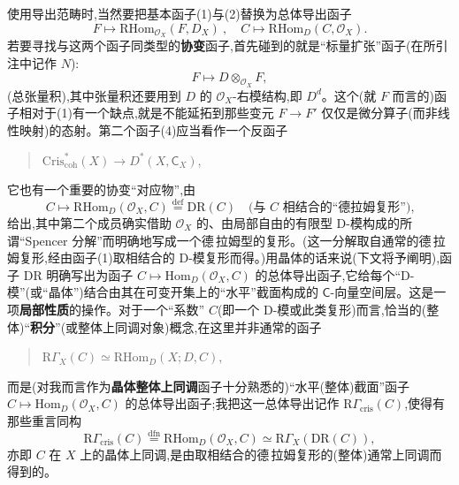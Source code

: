 \dmark{}使用导出范畴时,当然要把基本函子(1)与(2)替换为总体导出函子
\begin{equation*}
F\longmapsto \mathrm{RHom}_{\mathcal{O}_{X}}(F,D_{X})\ ,\quad C\longmapsto \mathrm{RHom}_{D}(C,\mathcal{O}_{X}).
\tag{4}
\end{equation*}
若要寻找与这两个函子同类型的\textbf{协变}函子,首先碰到的就是“标量扩张”函子(在所引注中记作 $N$):
\begin{equation*}
F\longmapsto D\otimes_{\mathcal{O}_{X}}F,
\tag{5}
\end{equation*}
(总张量积),其中张量积还要用到 $D$ 的 $\mathcal{O}_{X}$-右模结构,即 $D^{d}$。这个(就 $F$ 而言的)函子相对于(1)有一个缺点,就是不能延拓到那些变元 $F\to F'$ 仅仅是微分算子(而非线性映射)的态射。第二个函子(4)应当看作一个反函子
\begin{quote}
$\mathrm{Cris}^{*}_{\mathrm{coh}}(X)\longrightarrow D^{*}(X,\mathsf{C}_{X})$,
\end{quote}
它也有一个重要的协变“对应物”,由
\begin{equation*}
C\longmapsto \mathrm{RHom}_{D}(\mathcal{O}_{X},C)\overset{\mathrm{def}}{=}\mathrm{DR}(C) \quad \text{(与 $C$ 相结合的“德拉姆复形”),}
\tag{6}
\end{equation*}
给出,其中第二个成员确实借助 $\mathcal{O}_{X}$ 的、由局部自由的有限型 D-模构成的所谓“Spencer 分解”而明确地写成一个德\,拉姆型的复形。(这一分解取自通常的德\,拉姆复形,经由函子(1)取相结合的 D-模复形而得。)用晶体的话来说(下文将予阐明),函子 $\mathrm{DR}$ 明确写出为函子 $C\mapsto \mathrm{Hom}_{D}(\mathcal{O}_{X},C)$ 的总体导出函子,它给每个“D-模”(或“晶体”)结合由其在可变开集上的“水平”截面构成的 $\mathsf{C}$-向量空间层。这是一项\textbf{局部性质}的操作。对于一个“系数” $C$(即一个 D-模或此类复形)而言,恰当的(整体)“\textbf{积分}”(或整体上同调对象)概念,在这里并非通常的函子
\begin{quote}
$\mathrm{R}\Gamma_{X}(C)\simeq \mathrm{RHom}_{D}(X;D,C)$,
\end{quote}
而是(对我而言作为\textbf{晶体整体上同调}函子十分熟悉的)“水平(整体)截面”函子 $C\mapsto \mathrm{Hom}_{D}(\mathcal{O}_{X},C)$ 的总体导出函子;我把这一总体导出记作 \dmark{}$\mathrm{R}\Gamma_{\mathrm{cris}}(C)$,使得有那些重言同构
\begin{equation*}
\mathrm{R}\Gamma_{\mathrm{cris}}(C)\overset{\mathrm{dfn}}{=}\mathrm{RHom}_{D}(\mathcal{O}_{X},C)\simeq \mathrm{R}\Gamma_{X}(\mathrm{DR}(C)),
\tag{7}
\end{equation*}
亦即 $C$ 在 $X$ 上的晶体上同调,是由取相结合的德\,拉姆复形的(整体)通常上同调而得到的。

